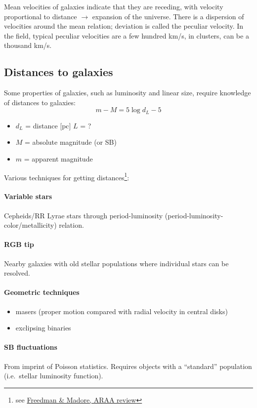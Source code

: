 \documentclass{article}
\newcommand{\mynotes}[1]{\textcolor{cadmiumgreen}{#1}}
\begin{document}
Mean velocities of galaxies indicate that they are receding, with velocity
proportional to distance $\rightarrow$ expansion of the universe.
There is a dispersion of
velocities around the mean relation; deviation is called the peculiar velocity.
In the field, typical peculiar velocities are a few hundred km/s, in clusters,
can be a thousand km/s.

\subsection{Distances to galaxies}
Some properties of galaxies, such as luminosity and linear size,
require knowledge of distances to galaxies:
\[
    m - M = 5\log{d_{L}} - 5
    \]
\begin{itemize}
    \item $d_{L}$ = distance [pc] \mynotes{$L$ = ?}
    \item $M$ = absolute magnitude (or SB)
    \item $m$ = apparent magnitude
\end{itemize}

Various techniques for getting distances\footnote{see
\href{http://adsabs.harvard.edu/abs/2010ARA\%26A..48..673F}
{Freedman \& Madore, ARAA review}}:

\paragraph{Variable stars}
Cepheids/RR Lyrae stars through period-luminosity
(period-luminosity-color/metallicity) relation.

\paragraph{RGB tip}
Nearby galaxies with old stellar populations where individual stars can
be resolved.

\paragraph{Geometric techniques}
\begin{itemize}
    \item masers (proper motion compared with radial velocity in central disks)
    \item exclipsing binaries
\end{itemize}

\paragraph{SB fluctuations}
From imprint of Poisson statistics.
Requires objects with a ``standard'' population (i.e.\ stellar
luminosity function).
\end{document}
